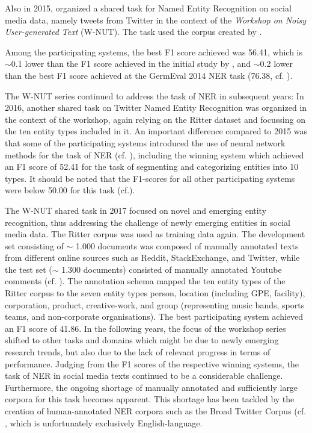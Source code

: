 Also in 2015, \citeauthor{baldwin_shared_2015} organized a shared task for Named Entity Recognition on social media data, namely tweets from Twitter in the context of the \textit{Workshop on Noisy User-generated Text} (W-NUT). The task used the corpus created by \cite{ritter_2011}. 


Among the participating systems, the best F1 score achieved was 56.41, which is $\sim$0.1 lower than the F1 score achieved in the initial study by \cite{ritter_2011}, and $\sim$0.2 lower than the best F1 score achieved at the GermEval 2014 NER task (76.38, cf. \cite{benikova2014germeval}). 

The W-NUT series continued to address the task of NER in subsequent years: 
In 2016, another shared task on Twitter Named Entity Recognition was organized in the context of the workshop, again relying on the Ritter dataset and focussing on the ten entity types included in it.  
An important difference compared to 2015 was that some of the participating systems introduced the use of neural network methods for the task of NER (cf. \cite{strauss_results_2016}), including the winning system which achieved an F1 score of 52.41 for the task of segmenting and categorizing entities into 10 types. It should be noted that the F1-scores for all other participating systems were below 50.00 for this task (cf.\cite{strauss_results_2016}). 

The W-NUT shared task in 2017 focused on novel and emerging entity recognition, thus addressing the challenge of newly emerging entities in social media data. The Ritter corpus was used as training data again. The development set consisting of $\sim$ 1.000 documents was composed of manually annotated texts from different online sources such as Reddit, StackExchange, and Twitter, while the test set ($\sim$ 1.300 documents) consisted of manually annotated Youtube comments (cf. \cite{derczynski_results_2017}). The annotation schema mapped the ten entity types of the Ritter corpus to the seven entity types person, location (including GPE, facility), corporation, product, creative-work, and group (representing music bands, sports teams, and non-corporate organisations). The best participating system achieved an F1 score of 41.86. In the following years, the focus of the workshop series shifted to other tasks and domains which might be due to newly emerging research trends, but also due to the lack of relevant progress in terms of performance. 
Judging from the F1 scores of the respective winning systems, the task of NER in social media texts continued to be a considerable challenge. Furthermore, the ongoing shortage of manually annotated and sufficiently large corpora for this task becomes apparent. This shortage has been tackled by the creation of human-annotated NER corpora such as the Broad Twitter Corpus (cf. \cite{derczynski-etal-2016-broad}, which is unfortunately exclusively English-language. 

